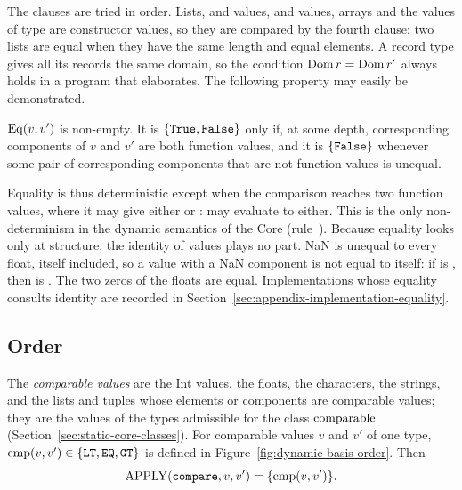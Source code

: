 The clauses are tried in order. Lists,  and  values,
 and  values, arrays and the values of type 
are constructor values, so they are compared by the fourth clause: two lists
are equal when they have the same length and equal elements. A record type gives all its records the same
domain, so the condition $\mathrm{Dom}\, r=\mathrm{Dom}\, r'$ always holds in a program that
elaborates. The following property may easily be demonstrated.
\begin{property}
$\mathrm{Eq}(v,v')$ is non-empty. It is $\{\textnormal{\texttt{True}},\textnormal{\texttt{False}}\}$ only if, at some
depth, corresponding components of $v$ and $v'$ are both function values, and
it is $\{\textnormal{\texttt{False}}\}$ whenever some pair of corresponding components that are
not function values is unequal.
\end{property}
Equality is thus deterministic except when the comparison reaches two
function values, where it may give either  or :
 may evaluate to
either. This is the only non-determinism in the dynamic semantics of the
Core (rule~). %
Because equality looks only at structure, the identity of values plays no
part. NaN is unequal to every float, itself included, so a value with a NaN
component is not equal to itself: if  is , then
 is . %
The two zeros of the floats are equal. Implementations whose equality
consults identity are recorded in
Section~\ref{sec:appendix-implementation-equality}.

\subsection{Order}\label{sec:appendix-dynamic-basis-order}

The \emph{comparable values} are the Int values, the floats, the characters,
the strings, and the lists and tuples whose elements or components are
comparable values; they are the values of the types admissible for the class
$\mathrm{comparable}$ (Section~\ref{sec:static-core-classes}). For comparable values $v$ and
$v'$ of one type, $\mathrm{cmp}(v,v')\in\{\textnormal{\texttt{LT}},\textnormal{\texttt{EQ}},\textnormal{\texttt{GT}}\}$ is defined in
Figure~\ref{fig:dynamic-basis-order}. Then
\[
  \mathrm{APPLY}(\textnormal{\texttt{compare}},v,v')=\{\mathrm{cmp}(v,v')\}.
\]

